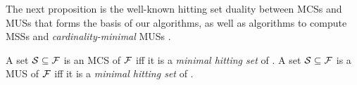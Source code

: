 
The next proposition is the well-known hitting set duality \cite{DBLP:journals/jar/LiffitonS08,ai/Reiter87}  between MCSs and MUSs that forms the basis of our algorithms, as well as algorithms to compute MSSs \cite{DBLP:conf/sat/DaviesB13} and \emph{cardinality-minimal} MUSs \cite{ignatiev2015smallest}.

\begin{proposition}\label{prop:MCS-MUS-hittingset}
%     
    A set  $\mathcal{S} \subseteq \mathcal{F} $ is an MCS of $ \mathcal{F} $ iff  it is a \emph{minimal hitting set} of \muses{\formula}.
% 
    A set  $\mathcal{S} \subseteq \mathcal{F} $ is a MUS of $ \mathcal{F} $ iff  it is a \emph{minimal hitting set} of \mcses{\formula}.
\end{proposition}
 


